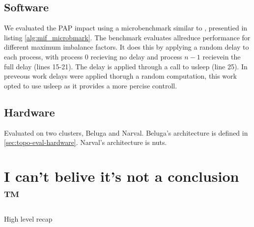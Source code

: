 


\subsection{Software}
We evaluated the PAP impact using a microbenchmark similar to \cite{Faraj2008StudyProcArrivalMPIColl}, presentied in listing \ref{alg:mif_microbmark}.
The benchmark evaluates allreduce performance for different maximum imbalance factors. 
It does this by applying a random delay to each process, with process 0 recieving no delay and process $n-1$ recievein the full delay (lines 15-21).
The delay is applied through a call to usleep (line 25).
In preveous work \cite{Faraj2008StudyProcArrivalMPIColl, Alizadeh2022PAPCollDL} delays were applied thorugh a random computation, this work opted to use usleep as it provides a more percise controll.



\subsection{Hardware}
Evaluated on two clusters, Beluga and Narval.
Beluga's architecture is defined in \ref{sec:topo-eval-hardware}.
Narval's architecture is nuts.

\section{I can't belive it's not a conclusion ™}
High level recap

